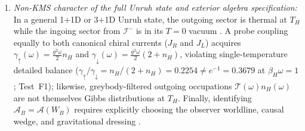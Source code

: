 \documentclass[11pt,a4paper]{article}
\theoremstyle{definition}
\theoremstyle{remark}
\newcommand{\cA}{\mathcal{A}}
\newcommand{\cT}{\mathcal{T}}
\newcommand{\1}{\mathbf{1}}
\begin{document}
\begin{enumerate}
  \begin{equation}\label{eq:chiral-current-rates}
    G_R^>(\omega) = \frac{\omega}{2}\bigl(1 + n_{\mathrm{BE}}(\omega/T_H)\bigr), \qquad
    G_R^<(\omega) = \frac{\omega}{2}\,n_{\mathrm{BE}}(\omega/T_H), \qquad
    \rho_{\mathrm{spec}}(\omega) = \frac{\omega}{2} \quad (\omega > 0),
  \end{equation}
  and hence $\gamma_\downarrow(\omega) = \frac{g^2\omega}{2}(1+n_{\mathrm{BE}}(\omega/T_H))$, $\gamma_\uparrow(\omega) = \frac{g^2\omega}{2}n_{\mathrm{BE}}(\omega/T_H)$ via \eqref{eq:wightman-rates} (in Test~F1, regulated numerical Fourier quadrature directly verifies the vacuum-current normalization $\int dt\,e^{i\Omega t}W_J(t)=(\Omega/2)e^{-\epsilon\Omega}$ to $1.44\times 10^{-15}$, while the thermal Bose factor $n_{\mathrm{BE}}(\omega/T_H)$ enters algebraically via KMS \eqref{eq:fdt}).
  \item \emph{Non-KMS character of the full Unruh state and exterior algebra specification:} In a general 1+1D or 3+1D Unruh state, the outgoing sector is thermal at $T_H$ while the ingoing sector from $\mathcal{I}^-$ is in its $T=0$ vacuum \cite{JuarezAubryLouko2014}. A probe coupling equally to both canonical chiral currents ($J_R$ and $J_L$) acquires $\gamma_\uparrow(\omega) = \frac{g^2\omega}{2}n_H$ and $\gamma_\downarrow(\omega) = \frac{g^2\omega}{2}(2 + n_H)$, violating single-temperature detailed balance ($\gamma_\uparrow/\gamma_\downarrow = n_H/(2+n_H) = 0.2254 \neq e^{-1} = 0.3679$ at $\beta_H\omega=1$; Test~F1); likewise, greybody-filtered outgoing occupations $\cT(\omega)n_H(\omega)$ are not themselves Gibbs distributions at $T_H$. Finally, identifying $\cA_B = \cA(W_B)$ requires explicitly choosing the observer worldline, causal wedge, and gravitational dressing \cite{JanaLoganayagamRangamani2020,ColinEllerin2021}.
\end{enumerate}
\end{document}
